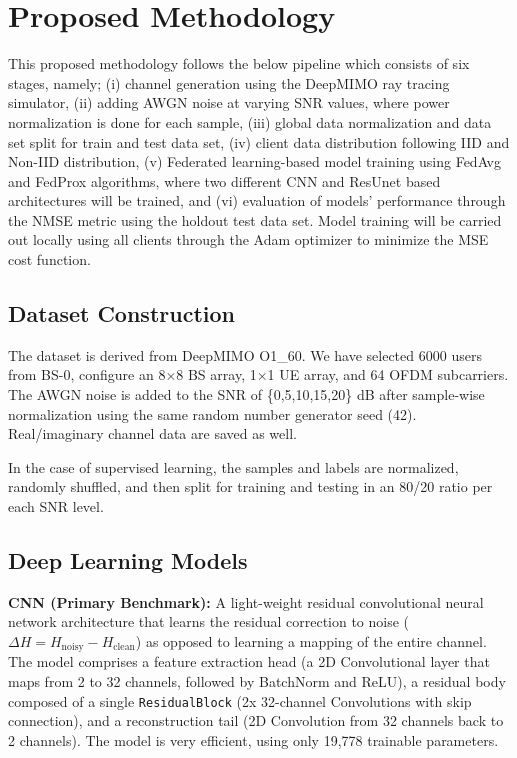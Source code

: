 \documentclass{llncs}
\begin{document}
\section{Proposed Methodology}
This proposed methodology follows the below pipeline which consists of six stages, namely; (i) channel generation using the DeepMIMO ray tracing simulator, (ii) adding AWGN noise at varying SNR values, where power normalization is done for each sample, (iii) global data normalization and data set split for train and test data set, (iv) client data distribution following IID and Non-IID distribution, (v) Federated learning-based model training using FedAvg and FedProx algorithms, where two different CNN and ResUnet based architectures will be trained, and (vi) evaluation of models' performance through the NMSE metric using the holdout test data set. Model training will be carried out locally using all clients through the Adam optimizer to minimize the MSE cost function.

\subsection{Dataset Construction}
The dataset is derived from DeepMIMO O1\_60. We have selected 6000 users from BS-0, configure an 8$\times$8 BS array, 1$\times$1 UE array, and 64 OFDM subcarriers. The AWGN noise is added to the SNR of \{0,5,10,15,20\} dB after sample-wise normalization using the same random number generator seed (42). Real/imaginary channel data are saved as well.

In the case of supervised learning, the samples and labels are normalized, randomly shuffled, and then split for training and testing in an 80/20 ratio per each SNR level.

\subsection{Deep Learning Models}
\textbf{CNN (Primary Benchmark):} A light-weight residual convolutional neural network architecture that learns the residual correction to noise ($\Delta H = H_{\text{noisy}} - H_{\text{clean}}$) as opposed to learning a mapping of the entire channel. The model comprises a feature extraction head (a 2D Convolutional layer that maps from 2 to 32 channels,
followed by BatchNorm and ReLU), a residual body composed of a single \texttt{ResidualBlock} (2x 32-channel Convolutions with skip connection), and a reconstruction tail (2D Convolution from 32 channels back to 2 channels). The model is very efficient, using only 19,778 trainable parameters.
\end{document}

